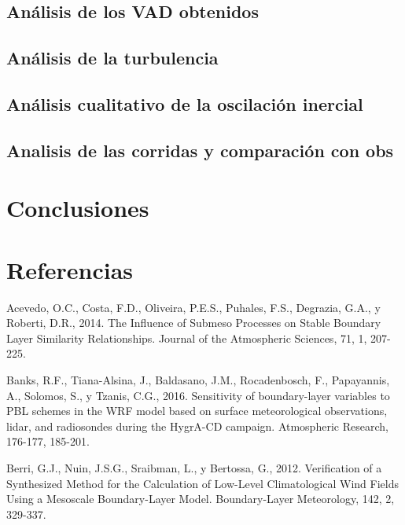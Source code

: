 \documentclass[12pt,spanish,oneside]{book}
\begin{document}
\section{Análisis de los VAD
obtenidos}\label{analisis-de-los-vad-obtenidos}

\section{Análisis de la turbulencia}\label{analisis-de-la-turbulencia}

\section{Análisis cualitativo de la oscilación
inercial}\label{analisis-cualitativo-de-la-oscilacion-inercial}

\section{Analisis de las corridas y comparación con
obs}\label{analisis-de-las-corridas-y-comparacion-con-obs}

\chapter{Conclusiones}\label{conclusiones}

\chapter*{Referencias}\label{referencias}

\hypertarget{refs}{}
\hypertarget{ref-Acevedo2014}{}
Acevedo, O.C., Costa, F.D., Oliveira, P.E.S., Puhales, F.S., Degrazia,
G.A., y Roberti, D.R., 2014. The Influence of Submeso Processes on
Stable Boundary Layer Similarity Relationships. Journal of the
Atmospheric Sciences, 71, 1, 207-225.

\hypertarget{ref-Banks2016}{}
Banks, R.F., Tiana-Alsina, J., Baldasano, J.M., Rocadenbosch, F.,
Papayannis, A., Solomos, S., y Tzanis, C.G., 2016. Sensitivity of
boundary-layer variables to PBL schemes in the WRF model based on
surface meteorological observations, lidar, and radiosondes during the
HygrA-CD campaign. Atmospheric Research, 176-177, 185-201.

\hypertarget{ref-Berri2012}{}
Berri, G.J., Nuin, J.S.G., Sraibman, L., y Bertossa, G., 2012.
Verification of a Synthesized Method for the Calculation of Low-Level
Climatological Wind Fields Using a Mesoscale Boundary-Layer Model.
Boundary-Layer Meteorology, 142, 2, 329-337.
\end{document}
